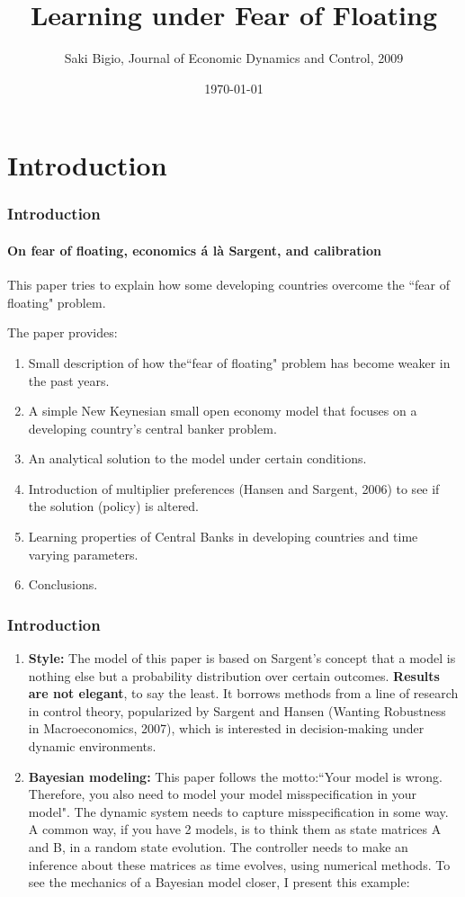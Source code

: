 \documentclass{beamer}
\title{Learning under Fear of Floating}
\author{Saki Bigio, Journal of Economic Dynamics and Control, 2009}
\date{\today}
\begin{document}
\frame{\titlepage}
\section[Outline]{}
\frame{\tableofcontents}
\section{Introduction}
\begin{frame} 
\frametitle{Introduction} 
\framesubtitle{On fear of floating, economics \'{a} l\`{a} Sargent, and calibration} 

This paper tries to explain how some developing countries overcome the ``fear of
floating" problem. 

The paper provides:
\begin{enumerate} 
\item Small description of how the``fear of floating" problem has become weaker
in the past years.
\item A simple New Keynesian small open economy model that focuses on a
developing country's central banker problem.
\item An analytical solution to the model under certain conditions.
\item Introduction of multiplier preferences (Hansen and Sargent, 2006) to see if the solution (policy) is
altered.
\item Learning properties of Central Banks in developing countries and time
varying parameters.
\item Conclusions.
\end{enumerate} 
\end{frame}

\begin{frame} 
\frametitle{Introduction} 
\begin{enumerate} 
\item \textbf{Style:} The model of this paper is based on Sargent's concept that a
model is nothing else but a probability distribution over certain outcomes.
\textbf{Results are not elegant}, to say the least. It borrows methods from a 
line of research in control theory, popularized by Sargent and Hansen (Wanting Robustness in Macroeconomics, 2007),
which is interested in decision-making under dynamic environments.
 \item \textbf{Bayesian modeling:} This paper follows the motto:``Your model is wrong. Therefore, you also need to model your model
 misspecification in your model". The dynamic system needs to capture
 misspecification in some way. A common way, if you have 2 models, is to think
 them as state matrices A and B,  in a random state evolution. The controller
 needs to make an inference about these matrices as time evolves, using numerical
methods. To see the mechanics of a Bayesian model closer, I present this
example:
 \end{enumerate}
 \end{frame}
 
\end{document}
